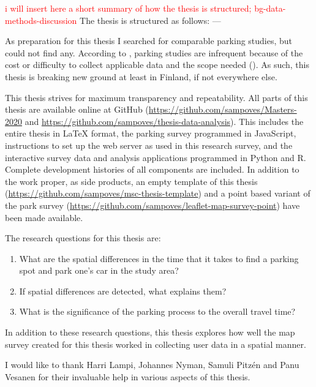 \textcolor{red}{i will insert here a short summary of how the thesis is structured; bg-data-methods-discussion}
The thesis is structured as follows: ---

As preparation for this thesis I searched for comparable parking studies, but could not find any. According to \citeauthor{Diallo2015}, parking studies are infrequent because of the cost or difficulty to collect applicable data and the scope needed (\citeyear{Diallo2015}). As such, this thesis is breaking new ground at least in Finland, if not everywhere else.

This thesis strives for maximum transparency and repeatability. All parts of this thesis are available online at GitHub (\textcolor{blue}{\url{https://github.com/sampoves/Masters-2020}} and \textcolor{blue}{\url{https://github.com/sampoves/thesis-data-analysis}}). This includes the entire thesis in LaTeX format, the parking survey programmed in JavaScript, instructions to set up the web server as used in this research survey, and the interactive survey data and analysis applications programmed in Python and R. Complete development histories of all components are included. In addition to the work proper, as side products, an empty template of this thesis (\textcolor{blue}{\url{https://github.com/sampoves/msc-thesis-template}}) and a point based variant of the park survey (\textcolor{blue}{\url{https://github.com/sampoves/leaflet-map-survey-point}}) have been made available.

\bigskip
\noindent
The research questions for this thesis are:

\begin{spacing}{1}
    \begin{enumerate}[label=\Roman*]
      \item What are the spatial differences in the time that it takes to find a parking spot and park one’s car in the study area?
      \item If spatial differences are detected, what explains them?
      \item What is the significance of the parking process to the overall travel time?
    \end{enumerate}
\end{spacing}
\bigskip
In addition to these research questions, this thesis explores how well the map survey created for this thesis worked in collecting user data in a spatial manner.

I would like to thank Harri Lampi, Johannes Nyman, Samuli Pitzén and Panu Vesanen for their invaluable help in various aspects of this thesis.